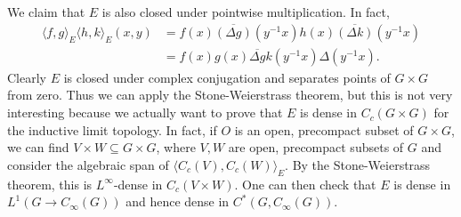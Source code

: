 \documentclass[12pt]{report}
\theoremstyle{definition}
\begin{document}
    We claim that $E$ is also closed under pointwise multiplication. In fact,
\begin{align*}
    \langle f, g\rangle_E\langle h, k\rangle_E(x, y) &= f(x)\overline{(\Delta g)}(y^{-1}x) h(x) \overline{(\Delta k)}(y^{-1}x)\\
        &= f(x)g(x) \overline{\Delta g}k(y^{-1}x) \Delta(y^{-1}x).
\end{align*}
    Clearly $E$ is closed under complex conjugation and separates points of $G \times G$ from zero. Thus we can apply the Stone-Weierstrass theorem, but this is not very interesting because we actually want to prove that $E$ is dense in $C_c(G \times G)$ for the inductive limit topology. In fact, if $O$ is an open, precompact subset of $G \times G$, we can find $V \times W \subseteq G \times G$, where $V,W$ are open, precompact subsets of $G$ and consider the algebraic span of $\langle C_c(V), C_c(W)\rangle_E$. By the Stone-Weierstrass theorem, this is $L^\infty$-dense in $C_c(V \times W)$. One can then check that $E$ is dense in $L^1(G \to C_\infty(G))$ and hence dense in $C^*(G, C_\infty(G))$.
\end{document}
